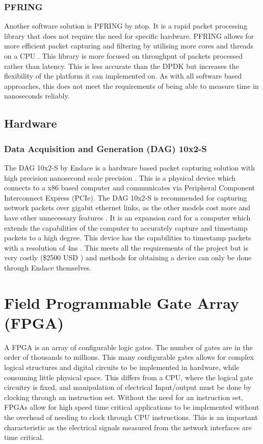 \subsubsection{PF\textunderscore RING}

Another software solution is PF\textunderscore RING by ntop\texttrademark. 
It is a rapid packet processing library that does not require the need for specific hardware.  
PF\textunderscore RING allows for more efficient packet capturing and filtering by utilising more cores and threads on a CPU \cite{pfringworks}.
This library is more focused on throughput of packets processed rather than latency. 
This is less accurate than the DPDK but increases the flexibility of the platform it can implemented on. 
As with all software based approaches, this does not meet the requirements of being able to measure time in nanoseconds reliably.

\subsection{Hardware}

\subsubsection{Data Acquisition and Generation (DAG) 10x2-S}

The DAG 10x2-S by Endace is a hardware based packet capturing solution with high precision nanosecond scale precision \cite{dagprecision}. 
This is a physical device which connects to a x86 based computer and communicates via Peripheral Component Interconnect Express (PCIe). 
The DAG 10x2-S is recommended for capturing network packets over gigabit ethernet links, as the other models cost more and have other unnecessary features \cite{dagfeatures}.
It is an expansion card for a computer which extends the capabilities of the computer to accurately capture and timestamp packets to a high degree. 
This device has the capabilities to timestamp packets with a resolution of 4ns \cite{dagprecision}. 
This meets all the requirements of the project but is very costly (\$2500 USD \cite{dagprice}) and methods for obtaining a device can only be done through Endace themselves. 

\section{Field Programmable Gate Array (FPGA)}

A FPGA is an array of configurable logic gates. The number of gates are in the order of thousands to
millions. This many configurable gates allows for complex logical structures and digital circuits to be
implemented in hardware, while consuming little physical space. This differs from a CPU, where the
logical gate circuitry is fixed, and manipulation of electrical Input/output must be done by clocking
through an instruction set. Without the need for an instruction set, FPGAs allow for high speed time
critical applications to be implemented without the overhead of needing to clock through CPU
instructions. This is an important characteristic as the electrical signals measured from the network
interfaces are time critical.

